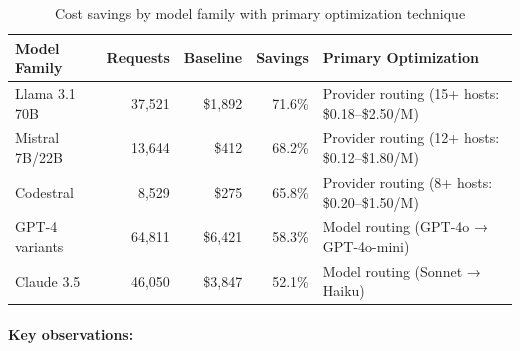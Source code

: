 \documentclass[english]{article}
\begin{document}
\begin{table}[H]
\centering
\caption{Cost savings by model family with primary optimization technique}
\begin{tabular}{|l|r|r|r|p{4cm}|}
\hline
\textbf{Model Family} & \textbf{Requests} & \textbf{Baseline} & \textbf{Savings} & \textbf{Primary Optimization} \\
\hline
Llama 3.1 70B & 37,521 & \$1,892 & 71.6\% & Provider routing (15+ hosts: \$0.18--\$2.50/M) \\
\hline
Mistral 7B/22B & 13,644 & \$412 & 68.2\% & Provider routing (12+ hosts: \$0.12--\$1.80/M) \\
\hline
Codestral & 8,529 & \$275 & 65.8\% & Provider routing (8+ hosts: \$0.20--\$1.50/M) \\
\hline
GPT-4 variants & 64,811 & \$6,421 & 58.3\% & Model routing (GPT-4o → GPT-4o-mini) \\
\hline
Claude 3.5 & 46,050 & \$3,847 & 52.1\% & Model routing (Sonnet → Haiku) \\
\hline
\end{tabular}
\end{table}

\paragraph{Key observations:}
\end{document}
